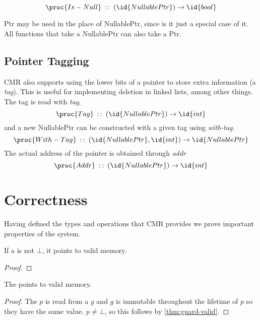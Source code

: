 \begin{equation}\label{eq:nullable-is-null}
  \proc{Is-Null}\typeof (\id{NullablePtr}) \to \id{bool}
\end{equation}

Ptr may be used in the place of NullablePtr, since is it just a special case of it. All functions
that take a NullablePtr can also take a Ptr.



\subsection{Pointer Tagging}

CMR also supports using the lower bits of a pointer to store extra information (a \emph{tag}). This
is useful for implementing deletion in linked lists, among other things. The tag is read with
\emph{tag},
\begin{equation}\label{eq:ptr-tag}
  \proc{Tag}\typeof{} (\id{NullablePtr}) \to \id{int}
\end{equation}
and a new NullablePtr can be constructed with a given tag using \emph{with-tag}.
\begin{equation}\label{eq:ptr-with-tag}
  \proc{With-Tag}\typeof{} (\id{NullablePtr}, \id{int}) \to \id{NullablePtr}
\end{equation}
The actual address of the pointer is obtained through \emph{addr}
\begin{equation}\label{eq:ptr-addr}
  \proc{Addr}\typeof{} (\id{NullablePtr}) \to \id{int}
\end{equation}



\section{Correctness\label{sec:cmr-correctness}}

Having defined the types and operations that CMR provides we prove important properties of the
system.

\begin{theorem}\label{thm:guard-valid}
  If a  is not $\bot$, it points to valid memory.
\end{theorem}
\begin{proof}
\end{proof}

\begin{lemma}\label{lm:ptr-valid}
  The  points to valid memory.
\end{lemma}
\begin{proof}
  The   $p$ is read from a  $g$ and $g$ is immutable throughout the lifetime of
  $p$ so they have the same value. $p \neq \bot$, so this follows by \cref{thm:guard-valid}.
\end{proof}

